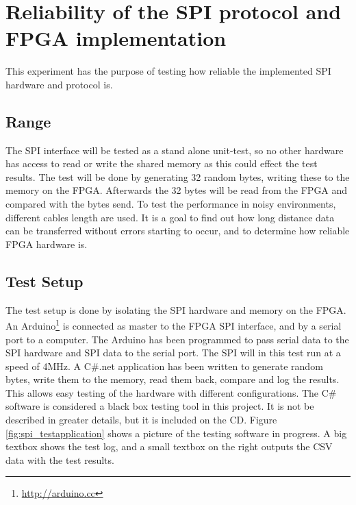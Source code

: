 \chapter{Reliability of the SPI protocol and FPGA implementation}
\label{sec:spi_rel_test}
This experiment has the purpose of testing how reliable the implemented SPI hardware and protocol is. 

\section{Range}	%
The SPI interface will be tested as a stand alone unit-test, so no other hardware has access to read or write the shared memory as this could effect the test results. The test will be done by generating 32 random bytes, writing these to the memory on the FPGA. Afterwards the 32 bytes will be read from the FPGA and compared with the bytes send. To test the performance in noisy environments, different cables length are used. It is a goal to find out how long distance data can be transferred without errors starting to occur, and to determine how reliable FPGA hardware is.


\section{Test Setup}
The test setup is done by isolating the SPI hardware and memory on the FPGA. An Arduino\footnote{\url{http://arduino.cc}} is connected as master to the FPGA SPI interface, and by a serial port to a computer. The Arduino has been programmed to pass serial data to the SPI hardware and SPI data to the serial port. The SPI will in this test run at a speed of 4MHz. A C\#.net application has been written to generate random bytes, write them to the memory, read them back, compare and log the results. This allows easy testing of the hardware with different configurations. The C\# software is considered a black box testing tool in this project. It is not be described in greater details, but it is included on the CD. Figure \ref{fig:spi_testapplication} shows a picture of the testing software in progress. A big textbox shows the test log, and a small textbox on the right outputs the CSV data with the test results.

